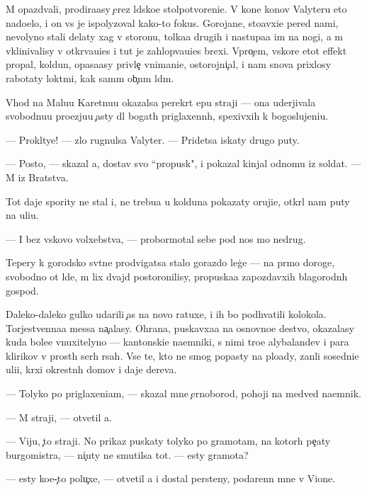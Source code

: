 \documentclass[10pt]{book}
\begin{document}
M{\yi} opazd{\yi}vali, prodira{\y}asy {\c}erez l{\iu}dsko{\y}e stolpotvoreni{\y}e. V kon{\q}e kon{\q}ov Valyteru eto nado{\y}elo, i on vs{\e} je ispolyzoval kako{\y}-to fokus. Gorojane, sto{\y}avxi{\y}e pered nami, nevolyno stali delaty xag v storonu, tolka{\y}a drugih i nastupa{\y}a im na nogi, a m{\yi} vklinivalisy v otkr{\yi}va{\y}u{\x}i{\y}es{\ia} i tut je zahlop{\yi}va{\y}u{\x}i{\y}es{\ia} brexi. Vpro{\c}em, vskore etot effekt propal, koldun, opasa{\y}asy privle{\c} vnimani{\y}e, ostorojni{\c}al, i nam snova prixlosy rabotaty lokt{\ia}mi, kak sam{\yi}m ob{\yi}{\c}n{\yi}m l{\iu}d{\ia}m.

V{\yi}hod na Malu{\y}u Karetnu{\y}u okazalsa perekr{\yi}t {\q}ep{\y}u straji — ona uderjivala svobodnu{\y}u pro{\y}ezju{\y}u {\c}asty dl{\ia} bogat{\yi}h priglaxenn{\yi}h, spexivxih k bogoslujeni{\y}u.

— Prokl{\ia}tye! — zlo rugnulsa Valyter. — Pridetsa iskaty drugo{\y} puty.

— Posto{\y}, — skazal {\y}a, dostav svo{\y} ``propusk", i pokazal kinjal odnomu iz soldat. — M{\yi} iz Bratstva.

Tot daje spority ne stal i, ne trebu{\y}a u kolduna pokazaty oruji{\y}e, otkr{\yi}l nam puty na uli{\q}u.

— I bez vs{\ia}kovo volxebstva, — probormotal sebe pod nos mo{\y} nedrug.

Tepery k gorodsko{\y} sv{\ia}t{\yi}ne prodvigatsa stalo gorazdo leg{\c}e — na pr{\ia}mo{\y} doroge, svobodno{\y} ot l{\iu}de{\y}, m{\yi} lix dvajd{\yi} postoronilisy, propuska{\y}a zapozdavxih blagorodn{\yi}h gospod.

Daleko-daleko gulko udarili {\c}as{\yi} na novo{\y} ratuxe, i ih bo{\y} podhvatili kolokola. Torjestvenna{\y}a messa na{\c}alasy. Ohrana, puskavxa{\y}a na osnovno{\y}e de{\y}stvo, okazalasy kuda bole{\y}e vnuxitelyno{\y} — kantonski{\y}e na{\y}emniki, s nimi tro{\y}e alybaland{\q}ev i para klirikov v prost{\yi}h ser{\yi}h r{\ia}sah. Vse te, kto ne smog popasty na plo{\x}ady, zan{\ia}li sosedni{\y}e uli{\q}i, kr{\yi}xi okrestn{\yi}h domov i daje derev{\y}a.

— Tolyko po priglaxeni{\y}am, — skazal mne {\c}ernoborod{\yi}{\y}, pohoji{\y} na medved{\ia} na{\y}emnik.

— M{\yi} straji, — otvetil {\y}a.

— Viju, {\c}to straji. No prikaz puskaty tolyko po gramotam, na kotor{\yi}h pe{\c}aty burgomistra, — ni{\c}uty ne smutilsa tot. — {\Y}esty gramota?

— {\Y}esty ko{\y}e-{\c}to polu{\c}xe, — otvetil {\y}a i dostal persteny, podarenn{\yi}{\y} mne v Vione.
\end{document}

